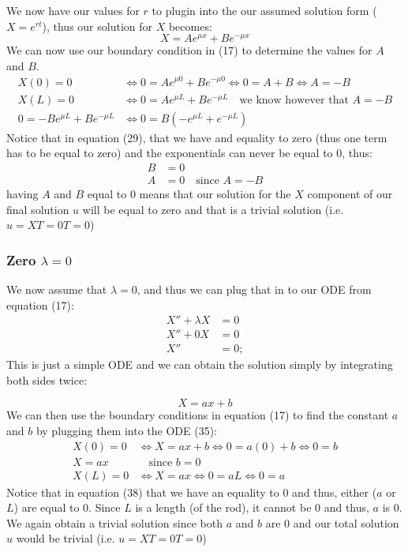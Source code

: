 \documentclass[11pt]{article}
\begin{document}
We now have our values for $r$ to plugin into the our assumed solution form ($X=e^{rt}$), thus our solution for $X$ becomes:
\begin{equation}
	X=Ae^{\mu x} + Be^{-\mu x}
\end{equation}
We can now use our boundary condition in (17) to determine the values for $A$ and $B$.
\begin{align}
	X(0)=0 & \Longleftrightarrow 0=Ae^{\mu 0} + Be^{-\mu 0} \Longleftrightarrow 0=A + B \Longleftrightarrow A=-B\\
	X(L)=0 & \Longleftrightarrow 0=Ae^{\mu L} + Be^{-\mu L} \quad\text{we know however that $A=-B$}\\
	0=-Be^{\mu L} + Be^{-\mu L} &\Longleftrightarrow 0 = B(-e^{\mu L} + e^{-\mu L}) 
\end{align}
Notice that in equation (29), that we have and equality to zero (thus one term has to be equal to zero) and the exponentials can never be equal to 0, thus:
\begin{align}
	B&=0\\
	A&=0 \quad\text{since $A=-B$}
\end{align}
having $A$ and $B$ equal to 0 means that our solution for the $X$ component of our final solution $u$ will be equal to zero and that is a trivial solution (i.e. $u=XT=0T=0$)

\subsubsection{Zero $\lambda=0$}
We now assume that $\lambda=0$, and thus we can plug that in to our ODE from equation (17):
\begin{align}
	X''+\lambda X&=0\\
	X''+0X&=0\\
	X''&=0;
\end{align}
This is just a simple ODE and we can obtain the solution simply by integrating both sides twice:

\begin{equation}
	X=ax+b
\end{equation}
We can then use the boundary conditions in equation (17) to find the constant $a$ and $b$ by plugging them into the ODE (35):
\begin{align}
	X(0)=0 & \Longleftrightarrow X=ax+b\Longleftrightarrow 0=a(0)+b \Longleftrightarrow 0=b \\
	X=ax &\quad \text{since $b=0$}\\
	 X(L) =0 & \Longleftrightarrow X=ax\Longleftrightarrow 0 = aL  \Longleftrightarrow 0=a
\end{align}
Notice that in equation (38) that we have an equality to 0 and thus, either ($a$ or $L$) are equal to 0. Since $L$ is a length (of the rod), it cannot be 0 and thus, $a$ is 0. We again obtain a trivial solution since both $a$ and $b$ are 0 and our total solution $u$ would be trivial (i.e. $u=XT=0T=0$)
\end{document}

